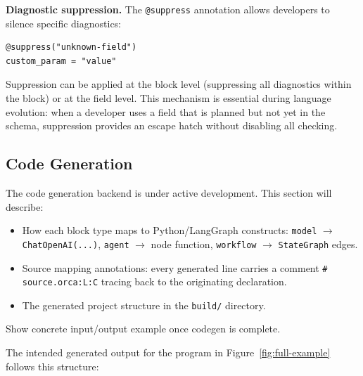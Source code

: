 \documentclass[sigconf,nonacm]{acmart}
\begin{document}
\noindent\textbf{Diagnostic suppression.} The \texttt{@suppress}
annotation allows developers to silence specific diagnostics:

\begin{lstlisting}
@suppress("unknown-field")
custom_param = "value"
\end{lstlisting}

Suppression can be applied at the block level (suppressing all diagnostics
within the block) or at the field level. This mechanism is essential during
language evolution: when a developer uses a field that is planned but not
yet in the schema, suppression provides an escape hatch without disabling
all checking.

\subsection{Code Generation}
\label{sec:compiler:codegen}

\begin{todobox}
The code generation backend is under active development. This section will
describe:
\begin{itemize}
  \item How each block type maps to Python/LangGraph constructs:
        \texttt{model} $\rightarrow$ \texttt{ChatOpenAI(...)},
        \texttt{agent} $\rightarrow$ node function,
        \texttt{workflow} $\rightarrow$ \texttt{StateGraph} edges.
  \item Source mapping annotations: every generated line carries a comment
        \texttt{\# source.orca:L:C} tracing back to the originating
        declaration.
  \item The generated project structure in the \texttt{build/} directory.
\end{itemize}
Show concrete input/output example once codegen is complete.
\end{todobox}

The intended generated output for the program in Figure~\ref{fig:full-example}
follows this structure:
\end{document}
